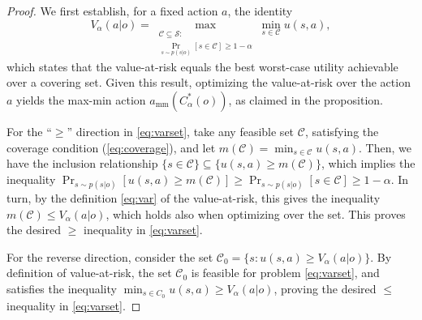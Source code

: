\documentclass[10pt,a4paper]{amsart}
\newcommand{\Sset}{\mathcal{S}}
\begin{document}
\begin{proof}
We first establish, for a fixed action $a$, the identity
\begin{equation}
\label{eq:varset}
V_\alpha(a| o)=\!\!\max_{\substack{\mathcal{C}\subseteq\Sset:\\ \Pr_{s\sim p(s| o)}[s\in \mathcal{C}]\ge 1-\alpha}}\!\!\min_{s\in \mathcal{C}}u(s,a),
\end{equation}
which states that the value-at-risk equals the best worst-case utility achievable over a
covering set. Given this result, optimizing the value-at-risk over the action $a$ yields the max-min action $a_{\mathrm{mm}}\!\left(C_\alpha^*(o)\right)$, as claimed in the proposition. 

For the ``$\ge$'' direction in \eqref{eq:varset}, take any
feasible set $\mathcal{C}$, satisfying the coverage condition (\ref{eq:coverage}), and let $m(\mathcal C)=\min_{s\in \mathcal{C}}u(s,a)$. Then, we have the inclusion relationship 
$\{s\in \mathcal{C}\}\subseteq\{u(s,a)\ge m(\mathcal C)\}$, which implies the inequality 
$\Pr_{s\sim p(s| o)}[u(s,a)\ge m(\mathcal C)]\ge\Pr_{s\sim p(s| o)}[s\in \mathcal{C}]\ge1-\alpha$. In turn,  by the
definition \eqref{eq:var} of the value-at-risk, this gives the inequality 
$m(\mathcal{C})\le V_\alpha(a| o)$, which holds also when optimizing over the set. This proves the desired  $\ge$ inequality in \eqref{eq:varset}.

For the reverse direction, consider the set
$\mathcal{C}_0=\{s:u(s,a)\ge V_\alpha(a|o)\}$. By definition of value-at-risk, the set $\mathcal{C}_0$ is  feasible for problem \eqref{eq:varset}, and
satisfies the inequality $\min_{s\in C_0}u(s,a)\ge V_\alpha(a|o)$, proving the desired $\le$ inequality in \eqref{eq:varset}.


\end{proof}
\end{document}
